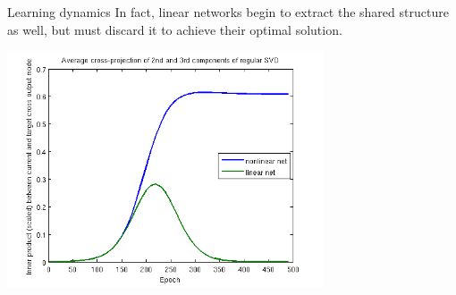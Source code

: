 \documentclass{beamer}
\begin{document}
\begin{frame}{Learning dynamics}
In fact, linear networks begin to extract the shared structure as well, but must discard it to achieve their optimal solution.
\begin{center}
\includegraphics[width=0.7\textwidth]{../writing/cogsci_2017/figures/SVD_cross_projection_learning.png}
\end{center}
\end{frame}
\end{document}
